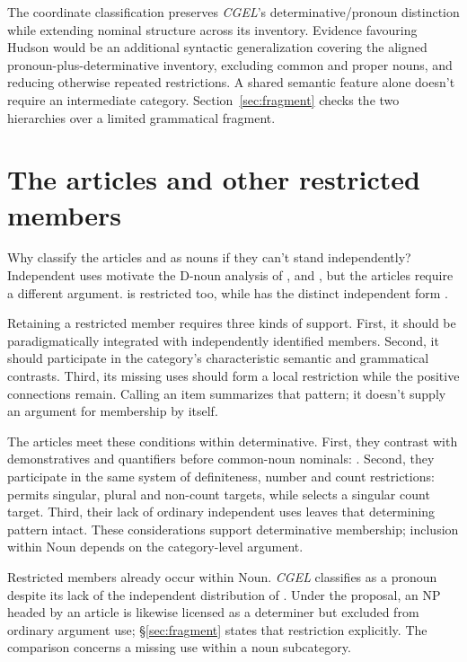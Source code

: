 \documentclass[12pt]{article}
\begin{document}
The coordinate classification preserves \textit{CGEL}'s determinative/pronoun distinction while extending nominal structure across its inventory. Evidence favouring Hudson would be an additional syntactic generalization covering the aligned pronoun-plus-determinative inventory, excluding common and proper nouns, and reducing otherwise repeated restrictions. A shared semantic feature alone doesn't require an intermediate category. Section~\ref{sec:fragment} checks the two hierarchies over a limited grammatical fragment.

\section{The articles and other restricted members}\label{sec:articles}

Why classify the articles  and  as nouns if they can't stand independently? Independent uses motivate the D-noun analysis of ,  and , but the articles require a different argument.  is restricted too, while  has the distinct independent form  \citep[371--372, 410--411]{huddleston2002}.

Retaining a restricted member requires three kinds of support. First, it should be paradigmatically integrated with independently identified members. Second, it should participate in the category's characteristic semantic and grammatical contrasts. Third, its missing uses should form a local restriction while the positive connections remain. Calling an item  summarizes that pattern; it doesn't supply an argument for membership by itself.

The articles meet these conditions within determinative. First, they contrast with demonstratives and quantifiers before common-noun nominals: . Second, they participate in the same system of definiteness, number and count restrictions:  permits singular, plural and non-count targets, while  selects a singular count target. Third, their lack of ordinary independent uses leaves that determining pattern intact. These considerations support determinative membership; inclusion within Noun depends on the category-level argument.

Restricted members already occur within Noun. \textit{CGEL} classifies  as a pronoun despite its lack of the independent distribution of  \citep[470--471]{huddleston2002}. Under the proposal, an NP headed by an article is likewise licensed as a determiner but excluded from ordinary argument use; §\ref{sec:fragment} states that restriction explicitly. The comparison concerns a missing use within a noun subcategory.
\end{document}
